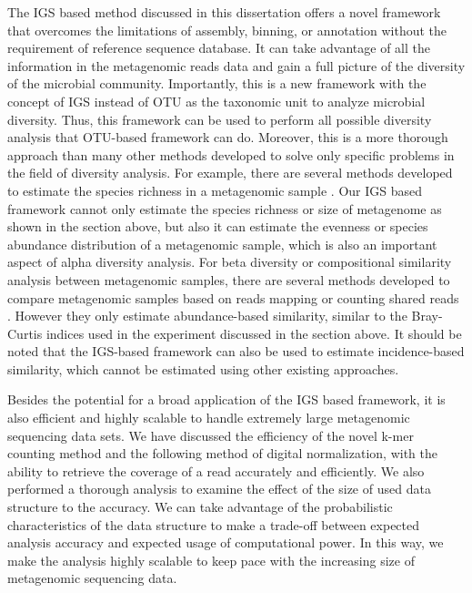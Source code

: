 \documentclass{article}
\begin{document}
The IGS based
method discussed in this dissertation offers a novel framework that
overcomes the limitations of assembly, binning, or annotation without the
requirement of reference sequence database. It can take advantage of all the 
information in the metagenomic reads data and gain a full picture of the
diversity of the microbial community. Importantly, this is a new
framework with the concept of IGS instead of OTU as the taxonomic unit to
analyze microbial diversity. Thus, this framework can be used to perform all possible
diversity analysis that OTU-based framework can do. Moreover, this is a more thorough
approach than many other methods developed to solve only specific
problems in the field of diversity analysis. For example, there are several
methods developed to estimate the species richness in a metagenomic sample 
\cite{Rodriguez-R2014}. Our IGS based framework cannot only
estimate the species richness or size of metagenome as shown in the section above, but
also it can estimate the evenness or species abundance distribution of a
metagenomic sample, which is also an important aspect of alpha diversity
analysis. For beta diversity or compositional similarity analysis between
metagenomic samples, there are several methods developed to compare metagenomic
samples based on reads mapping or counting shared reads \cite{Rodriguez-R:2013aa}.
However they only estimate abundance-based similarity, similar to
the Bray-Curtis indices used in the experiment discussed in the section above.
It should be noted that the 
IGS-based framework can also be used to estimate incidence-based similarity, 
which cannot be estimated using other existing approaches.


Besides the potential for a broad application of the IGS based framework, 
it is also efficient and
highly scalable to handle extremely large metagenomic sequencing data
sets. We have discussed the efficiency of the novel k-mer counting method and
the following method of digital normalization, with the ability to retrieve the
coverage of a read accurately and efficiently. We also performed a thorough analysis
to examine the effect of the size of used data structure to the accuracy. We can take
advantage of the probabilistic characteristics of the data structure to make a
trade-off between expected analysis accuracy and expected usage of
computational power. In this way, we make the analysis highly scalable to keep
pace with the increasing size of metagenomic sequencing data.  
\end{document}
